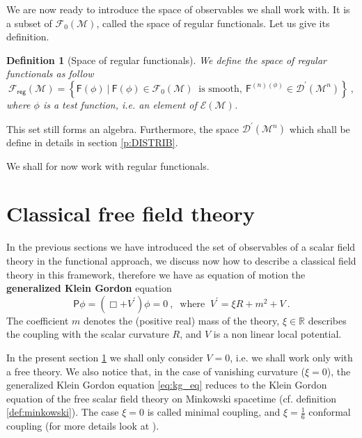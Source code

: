 \documentclass[11pt]{book}
\newcommand{\Dcal}{\mathcal{D}}
\newcommand{\Ecal}{\mathcal{E}}
\newcommand{\Fcal}{\mathcal{F}}
\newcommand{\Mcal}{\mathcal{M}}
\newcommand{\Rbb}{\mathbb{R}}
\newcommand{\Fsf}{\mathsf{F}}
\newcommand{\Psf}{\mathsf{P}}
\theoremstyle{break}
\newtheorem{definition}{Definition}[chapter]
\begin{document}
We are now ready to introduce the space of observables we shall work with. It is a subset of $\Fcal_0(\Mcal)$, called the space of regular functionals. Let us give its definition.


\begin{definition}[Space of regular functionals]\label{def:obs_reg}
We define the space of regular functionals as follow
%
\begin{equation*}
\Fcal_{\mathsf{reg}}(\Mcal) = \left\{ \Fsf(\phi) \ \bigg| \ \Fsf(\phi) \in \Fcal_0(\Mcal) \ \mbox{ is smooth}, \ \Fsf^{(n)(\phi)} \in \Dcal^\prime(\Mcal^{n}) \right\} \ ,
\end{equation*}
%
where $\phi$ is a test function, i.e. an element of $\Ecal(\Mcal)$.
\end{definition}

This set still forms an algebra. Furthermore, the space $\Dcal^\prime(\Mcal^{n})$ which shall be define in details in section \ref{p:DISTRIB}.


We shall for now work with regular functionals. 



\section{Classical free field theory}\label{p:CLASSICAL}


In the previous sections we have introduced the set of observables of a scalar field theory in the functional approach, we discuss now how to describe a classical field theory in this framework, therefore we have as equation of motion the \textbf{generalized Klein Gordon} equation
%
\begin{equation} 
\Psf \phi = \left( \Box + V^\prime \right) \phi = 0 \ , \
\mbox{ where } \ V^\prime = \xi R + m^2 + V \ . 
\label{eq:kg_eq}
\end{equation}
%
The coefficient $m$ denotes the (positive real) mass of the theory, $\xi \in \Rbb$ describes the coupling with the scalar curvature $R$, and $V$ is a non linear local potential.


In the present section \ref{p:CLASSICAL} we shall only consider $V=0$, i.e. we shall work only with a free theory. We also notice that, in the case of vanishing curvature ($\xi=0$), the generalized Klein Gordon equation \eqref{eq:kg_eq} reduces to the Klein Gordon equation of the free scalar field theory on Minkowski spacetime (cf. definition \ref{def:minkowski}). The case $\xi=0$ is called minimal coupling, and $\xi=\frac16$ conformal coupling (for more details look at \cite{waldGR}).
\end{document}

